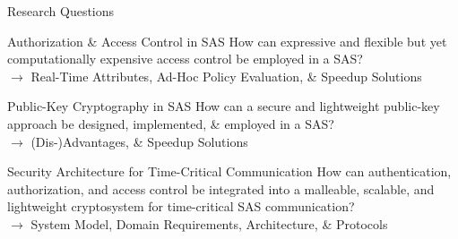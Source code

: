 \documentclass[en]{sdqbeamer}
\begin{document}
\begin{frame}{Research Questions}
    \begin{greenblock}{Authorization \& Access Control in SAS}
        How can expressive and flexible but yet computationally expensive access control be employed in a SAS?
        \\$\rightarrow$ Real-Time Attributes, Ad-Hoc Policy Evaluation, \& Speedup Solutions
    \end{greenblock}

    \begin{greenblock}{Public-Key Cryptography in SAS}
        How can a secure and lightweight public-key approach be designed, implemented, \& employed in a SAS?
        \\$\rightarrow$ (Dis-)Advantages, \& Speedup Solutions
    \end{greenblock}

    \begin{greenblock}{Security Architecture for Time-Critical Communication}
        How can authentication, authorization, and access control be integrated into a malleable, scalable, and lightweight cryptosystem for time-critical SAS communication?
        \\$\rightarrow$ System Model, Domain Requirements, Architecture, \& Protocols
    \end{greenblock}
\end{frame}
\end{document}
